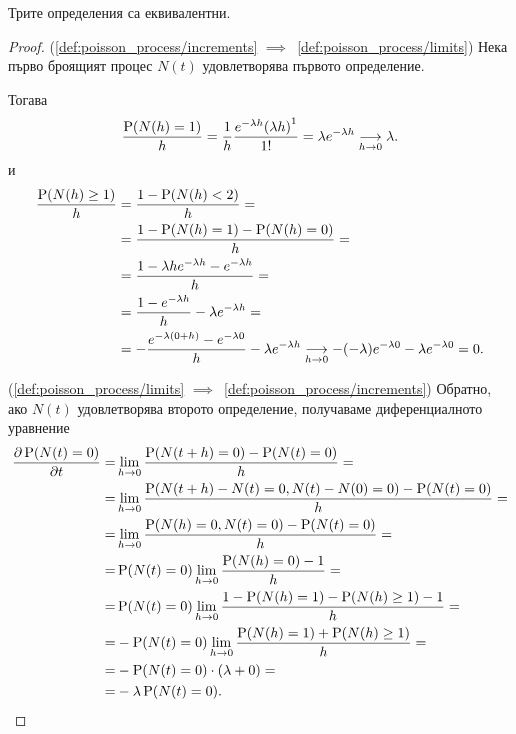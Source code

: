 \documentclass[numbers=endperiod, bibliography=totocnumbered]{scrartcl}
\begin{document}
\begin{theorem}
  Трите определения са еквивалентни.
\end{theorem}
\begin{proof}
  (\ref{def:poisson_process/increments} \( \implies \)~\ref{def:poisson_process/limits}) Нека първо броящият процес \( N(t) \) удовлетворява първото определение.

  Тогава
  \begin{align*}
    \frac {\Prob(N(h) = 1)} h
    =
    \frac 1 h \frac {e^{-\lambda h} {(\lambda h)}^1} {1!}
    =
    \lambda e^{-\lambda h}
    \Conv[h \to 0]{}
    \lambda.
  \end{align*}
  и
  \begin{align*}
    \frac {\Prob(N(h) \geq 1)} h
    &=
    \frac {1 - \Prob(N(h) < 2)} h
    = \\ &=
    \frac {1 - \Prob(N(h) = 1) - \Prob(N(h) = 0)} h
    = \\ &=
    \frac {1 - \lambda h e^{-\lambda h} - e^{-\lambda h}} h
    = \\ &=
    \frac {1 - e^{-\lambda h}} h - \lambda e^{-\lambda h}
    = \\ &=
    - \frac {e^{-\lambda (0 + h)} - e^{-\lambda 0}} h - \lambda e^{-\lambda h}
    \Conv[h \to 0]{}
    -(-\lambda) e^{-\lambda 0} - \lambda e^{-\lambda 0}
    =
    0.
  \end{align*}

  (\ref{def:poisson_process/limits} \( \implies \)~\ref{def:poisson_process/increments}) Обратно, ако \( N(t) \) удовлетворява второто определение, получаваме диференциалното уравнение
  \begin{align*}
    \frac {\partial \Prob(N(t) = 0)} {\partial t}
    =&
    \lim_{h \to 0} \frac {\Prob(N(t+h) = 0) - \Prob(N(t) = 0)} h
    = \\ =&
    \lim_{h \to 0} \frac {\Prob(N(t+h) - N(t) = 0, N(t) - N(0) = 0) - \Prob(N(t) = 0)} h
    = \\ =&
    \lim_{h \to 0} \frac {\Prob(N(h) = 0, N(t) = 0) - \Prob(N(t) = 0)} h
    = \\ =&
    \Prob(N(t) = 0) \lim_{h \to 0} \frac {\Prob(N(h) = 0) - 1} h
    = \\ =&
    \Prob(N(t) = 0) \lim_{h \to 0} \frac {1 - \Prob(N(h) = 1) - \Prob(N(h) \geq 1) - 1} h
    = \\ =&
    - \Prob(N(t) = 0) \lim_{h \to 0} \frac {\Prob(N(h) = 1) + \Prob(N(h) \geq 1)} h
    = \\ =&
    - \Prob(N(t) = 0) \cdot (\lambda + 0)
    = \\ =&
    -\lambda \Prob(N(t) = 0).
  \end{align*}


\end{proof}
\end{document}
